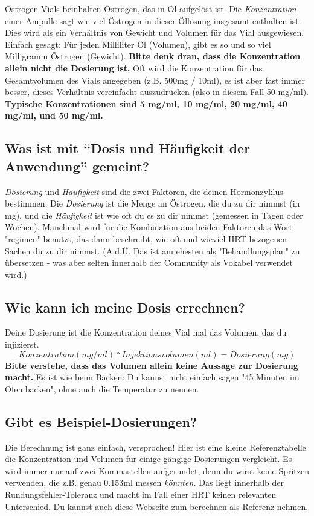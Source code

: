 \documentclass{article}
\begin{document}
Östrogen-Vials beinhalten Östrogen, das in Öl aufgelöst ist. Die \textit{Konzentration} einer Ampulle sagt wie viel Östrogen in dieser Öllösung insgesamt enthalten ist. Dies wird als ein Verhältnis von Gewicht und Volumen für das Vial ausgewiesen. Einfach gesagt: Für jeden Milliliter Öl (Volumen), gibt es so und so viel Milligramm Östrogen (Gewicht). \textbf{Bitte denk dran, dass die Konzentration allein nicht die Dosierung ist.} Oft wird die Konzentration für das Gesamtvolumen des Vials angegeben (z.B. 500mg / 10ml), es ist aber fast immer besser, dieses Verhältnis vereinfacht auszudrücken (also in diesem Fall 50 mg/ml). \textbf{Typische Konzentrationen sind 5 mg/ml, 10 mg/ml, 20 mg/ml, 40 mg/ml, und 50 mg/ml.}

\subsection{Was ist mit “Dosis und Häufigkeit der Anwendung” gemeint?}

\textit{Dosierung} und \textit{Häufigkeit} sind die zwei Faktoren, die deinen Hormonzyklus bestimmen. Die \textit{Dosierung} ist die Menge an Östrogen, die du zu dir nimmst (in mg), und die \textit{Häufigkeit} ist wie oft du es zu dir nimmst (gemessen in Tagen oder Wochen). Manchmal wird für die Kombination aus beiden Faktoren das Wort "regimen" benutzt, das dann beschreibt, wie oft und wieviel HRT-bezogenen Sachen du zu dir nimmst. (A.d.Ü. 
 Das ist am ehesten als "Behandlungsplan" zu übersetzen - was aber selten innerhalb der Community als Vokabel verwendet wird.)

\subsection{Wie kann ich meine Dosis errechnen?}

Deine Dosierung ist die Konzentration deines Vial mal das Volumen, das du injizierst. \[Konzentration (mg/ml) * Injektionsvolumen (ml) = Dosierung (mg)\] \textbf{Bitte verstehe, dass das Volumen allein keine Aussage zur Dosierung macht.} Es ist wie beim Backen: Du kannst nicht einfach sagen "45 Minuten im Ofen backen", ohne auch die Temperatur zu nennen. 

\subsection{Gibt es Beispiel-Dosierungen?}

Die Berechnung ist ganz einfach, versprochen! Hier ist eine kleine Referenztabelle die Konzentration und Volumen für einige gängige Dosierungen vergleicht. Es wird immer nur auf zwei Kommastellen aufgerundet, denn du wirst keine Spritzen verwenden, die z.B. genau 0.153ml messen \textit{könnten. }Das liegt innerhalb der Rundungsfehler-Toleranz und macht im Fall einer HRT keinen relevanten Unterschied. Du kannst auch \href{https://hrtcafe.net/Calc/}{diese Webseite zum berechnen} als Referenz nehmen.
\end{document}
